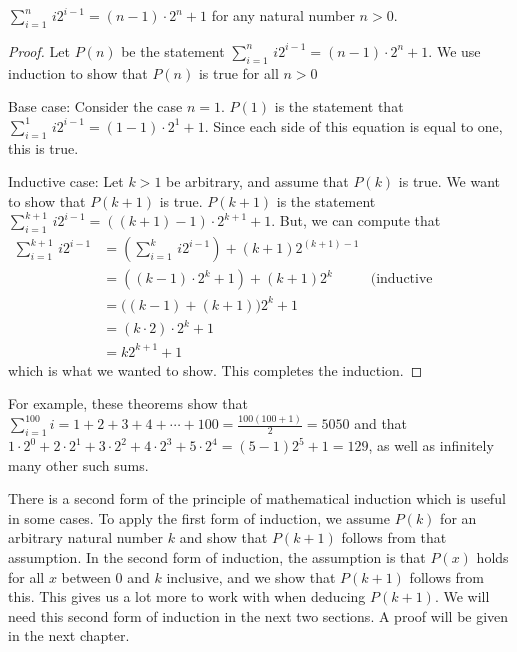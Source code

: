 \begin{theorem}\label{T-simplesum2}
$\displaystyle \sum_{i=1}^n\,i2^{i-1}=(n-1)\cdot2^n+1$ for any natural number $n>0$.
\end{theorem}
\begin{proof}
Let $P(n)$ be the statement $\displaystyle \sum_{i=1}^n\,i2^{i-1}=(n-1)\cdot2^n+1$.
We use induction to show that $P(n)$ is true for all $n>0$

Base case:  Consider the case $n=1$.  $P(1)$ is the statement
that $\displaystyle \sum_{i=1}^1\,i2^{i-1}=(1-1)\cdot2^1+1$.
Since each side of this equation is equal to one, this is true.

Inductive case:  Let $k>1$ be arbitrary, and assume that $P(k)$ is
true.  We want to show that $P(k+1)$ is true.  $P(k+1)$ is the
statement $\displaystyle \sum_{i=1}^{k+1}\,i2^{i-1}=((k+1)-1)\cdot2^{k+1}+1$.
But, we can compute that
\begin{align*}
   \sum_{i=1}^{k+1}\,i2^{i-1} &= \left(\sum_{i=1}^k\,i2^{i-1}\right)+(k+1)2^{(k+1)-1}\\
                              &= \left((k-1)\cdot2^k+1\right)+(k+1)2^k  &\text{(inductive hypothesis)}\\
                              &= \big((k-1)+(k+1)\big)2^k+1\\
                              &= (k\cdot2)\cdot2^k+1\\
                              &= k2^{k+1}+1
\end{align*}
which is what we wanted to show.  This completes the induction.
\end{proof}

For example, these theorems show that $\displaystyle\sum_{i=1}^{100}i=1+2+3+4+\cdots+100=\frac{100(100+1)}{2}= 5050$
and that $1\cdot2^0+2\cdot2^1+3\cdot2^2+4\cdot2^3+5\cdot2^4=(5-1)2^5+1=129$,
as well as infinitely many other such sums.

\medbreak

There is a second form of the principle of mathematical induction
which is useful in some cases.  To apply the first form of induction,
we assume $P(k)$ for an arbitrary natural number $k$ and show
that $P(k+1)$ follows from that assumption.  In the second form of
induction, the assumption is that $P(x)$ holds for all $x$ between 0 and
$k$ inclusive, and we show that $P(k+1)$ follows from this.  This gives
us a lot more to work with when deducing $P(k+1)$.  We will need this 
second form of induction in the next two sections.
A proof will be given in the next chapter.

